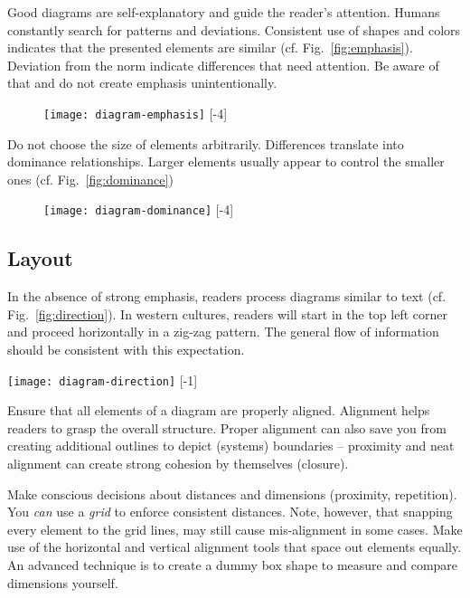 Good diagrams are self-explanatory and guide the reader's attention. Humans constantly search for patterns and deviations. Consistent use of shapes and colors indicates that the presented elements are similar (cf. Fig.~\ref{fig:emphasis}). Deviation from the norm indicate differences that need attention. Be aware of that and do not create emphasis unintentionally.

\begin{figure}[t]
\centering
\texttt{[image: diagram-emphasis]}
[-4\baselineskip]
\end{figure}

Do not choose the size of elements arbitrarily. Differences translate into dominance relationships. Larger elements usually appear to control the smaller ones (cf. Fig.~\ref{fig:dominance})

\begin{figure}[t]
\centering
\texttt{[image: diagram-dominance]}
[-4\baselineskip]
\end{figure}


\subsection{Layout}

In the absence of strong emphasis, readers process diagrams similar to text (cf. Fig.~\ref{fig:direction}). In western cultures, readers will start in the top left corner and proceed horizontally in a zig-zag pattern. The general flow of information should be consistent with this expectation.

\begin{marginfigure}
\centering
\texttt{[image: diagram-direction]}
[-1\baselineskip]
\end{marginfigure}


Ensure that all elements of a diagram are properly aligned. Alignment helps readers to grasp the overall structure. Proper alignment can also save you from creating additional outlines to depict (systems) boundaries – proximity and neat alignment can create strong cohesion by themselves (closure).

Make conscious decisions about distances and dimensions (proximity, repetition). You \emph{can} use a \emph{grid} to enforce consistent distances. Note, however, that snapping every element to the grid lines, may still cause mis-alignment in some cases. Make use of the horizontal and vertical alignment tools that space out elements equally. An advanced technique is to create a dummy box shape to measure and compare dimensions yourself.

